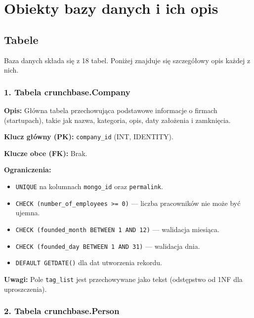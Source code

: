 \documentclass[12pt,a4paper]{article}
\begin{document}
\newpage
\section{Obiekty bazy danych i ich opis}

\subsection{Tabele}

Baza danych składa się z 18 tabel. Poniżej znajduje się szczegółowy opis każdej z nich.

\subsubsection{1. Tabela crunchbase.Company}

\textbf{Opis:} Główna tabela przechowująca podstawowe informacje o firmach (startupach), takie jak nazwa, kategoria, opis, daty założenia i zamknięcia.

\textbf{Klucz główny (PK):} \texttt{company\_id} (INT, IDENTITY).

\textbf{Klucze obce (FK):} Brak.

\textbf{Ograniczenia:}
\begin{itemize}[noitemsep]
    \item \texttt{UNIQUE} na kolumnach \texttt{mongo\_id} oraz \texttt{permalink}.
    \item \texttt{CHECK (number\_of\_employees >= 0)} --- liczba pracowników nie może być ujemna.
    \item \texttt{CHECK (founded\_month BETWEEN 1 AND 12)} --- walidacja miesiąca.
    \item \texttt{CHECK (founded\_day BETWEEN 1 AND 31)} --- walidacja dnia.
    \item \texttt{DEFAULT GETDATE()} dla dat utworzenia rekordu.
\end{itemize}

\textbf{Uwagi:} Pole \texttt{tag\_list} jest przechowywane jako tekst (odstępstwo od 1NF dla uproszczenia).

\subsubsection{2. Tabela crunchbase.Person}
\end{document}
